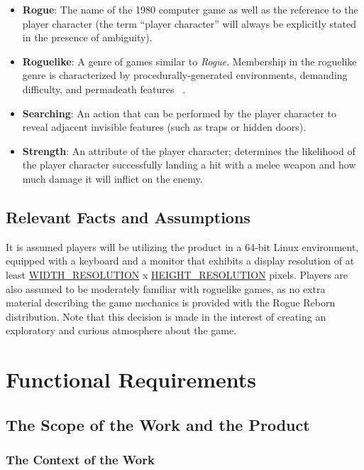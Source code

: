 \documentclass[12pt, titlepage]{article}
\begin{document}
\begin{itemize}
		\item \textbf{Rogue}: The name of the 1980 computer game as well as the reference to the player character (the term ``player character'' will always be explicitly stated in the presence of ambiguity).

		\item \textbf{Roguelike}: A genre of games similar to \textit{Rogue}. Membership in the roguelike genre is characterized by procedurally-generated environments, demanding difficulty, and permadeath features ~\citep{RoguelikeDefinition}.	

		\item \textbf{Searching}: An action that can be performed by the player character to reveal adjacent invisible features (such as traps or hidden doors).

		\item \textbf{Strength}: An attribute of the player character; determines the likelihood of the player character successfully landing a hit with a melee weapon and how much damage it will inflict on the enemy.
	\end{itemize}

	\subsection{Relevant Facts and Assumptions}

	It is assumed players will be utilizing the product in a 64-bit Linux environment, equipped with a keyboard and a monitor that exhibits a display resolution of at least \hyperref[symbolicParameters]{WIDTH\_RESOLUTION} x \hyperref[symbolicParameters]{HEIGHT\_RESOLUTION} pixels.  Players are also assumed to be moderately familiar with roguelike games, as no extra material describing the game mechanics is provided with the Rogue Reborn distribution.  Note that this decision is made in the interest of creating an exploratory and curious atmosphere about the game. 

\newpage

\section{Functional Requirements}

	\subsection{The Scope of the Work and the Product}

		\subsubsection{The Context of the Work}
\end{document}
